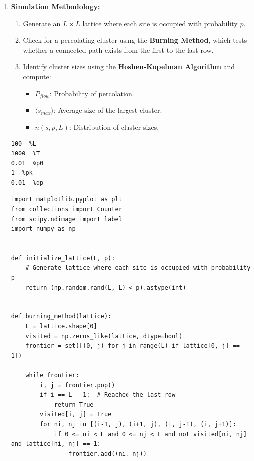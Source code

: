 \documentclass[10pt,letterpaper, onecolumn]{report}
\begin{document}
\begin{flushleft}
    \begin{enumerate}
        \item \textbf{Simulation Methodology:}
        \begin{enumerate}
            \item Generate an \( L \times L \) lattice where each site is occupied with probability \( p \).
            \item Check for a percolating cluster using the \textbf{Burning Method}, which tests whether a connected path exists from the first to the last row.
            \item Identify cluster sizes using the \textbf{Hoshen-Kopelman Algorithm} and compute:
                \begin{itemize}
                    \item \( P_{flow} \): Probability of percolation.
                    \item \( \langle s_{max} \rangle \): Average size of the largest cluster.
                    \item \( n(s, p, L) \): Distribution of cluster sizes.
                \end{itemize}
        \end{enumerate}

        \hfill\break

        \begin{lstlisting}[style=myPythonStyle, caption={perc-ini.txt}]
100  %L
1000  %T
0.01  %p0
1  %pk
0.01  %dp

        \end{lstlisting}
        \begin{lstlisting}[style=myPythonStyle, caption={Percolation Simulation Code}]
import matplotlib.pyplot as plt
from collections import Counter
from scipy.ndimage import label
import numpy as np


def initialize_lattice(L, p):
    # Generate lattice where each site is occupied with probability p
    return (np.random.rand(L, L) < p).astype(int)


def burning_method(lattice):
    L = lattice.shape[0]
    visited = np.zeros_like(lattice, dtype=bool)
    frontier = set([(0, j) for j in range(L) if lattice[0, j] == 1])

    while frontier:
        i, j = frontier.pop()
        if i == L - 1:  # Reached the last row
            return True
        visited[i, j] = True
        for ni, nj in [(i-1, j), (i+1, j), (i, j-1), (i, j+1)]:
            if 0 <= ni < L and 0 <= nj < L and not visited[ni, nj] and lattice[ni, nj] == 1:
                frontier.add((ni, nj))


\end{lstlisting}
\end{enumerate}
\end{flushleft}
\end{document}
